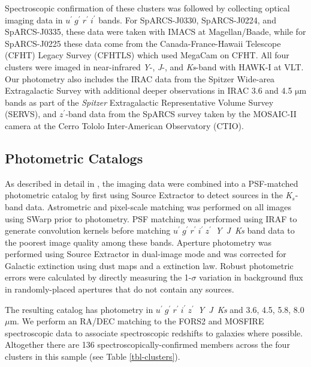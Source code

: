 Spectroscopic confirmation of these clusters was followed by collecting optical imaging data in $u^\prime\ g^\prime\ r^\prime\ i^\prime$ bands.
For SpARCS-J0330, SpARCS-J0224, and SpARCS-J0335, these data were taken with IMACS at Magellan/Baade, while for SpARCS-J0225 these data come from the Canada-France-Hawaii Telescope (CFHT) Legacy Survey (CFHTLS) which used MegaCam on CFHT.
All four clusters were imaged in near-infrared \textit{Y}-, \textit{J}-,  and \textit{Ks}-band with HAWK-I at VLT.
Our photometry also includes the IRAC data from the Spitzer Wide-area Extragalactic Survey \citep[SWIRE;][]{Lonsdale:2003ow} with additional deeper observations in IRAC 3.6 and 4.5 $\mathrm{\mu}$m bands as part of the \textit{Spitzer} Extragalactic Representative Volume Survey (SERVS), and $z^\prime$-band data from the SpARCS survey taken by the MOSAIC-II camera at the Cerro Tololo Inter-American Observatory (CTIO).

\subsection{Photometric Catalogs}

As described in detail in \citet{Nantais:2016aa}, the imaging data were combined into a PSF-matched photometric catalog by first using Source Extractor \citep{sextractor} to detect sources in the \textit{K$_s$}-band data.
Astrometric and pixel-scale matching was performed on all images using SWarp \citep{swarp} prior to photometry.
PSF matching was performed using IRAF to generate convolution kernels before matching $u^\prime~g^\prime~r^\prime~i^\prime~z^\prime$~\textit{Y~J~Ks} band data to the poorest image quality among these bands.
Aperture photometry was performed using Source Extractor in dual-image mode and was corrected for Galactic extinction using \citet{1998ApJ...500..525S} dust maps and a \citet{2011ApJ...737..103S} extinction law.
Robust photometric errors were calculated by directly measuring the 1-$\sigma$ variation in background flux in randomly-placed apertures that do not contain any sources.

The resulting catalog has photometry in $u^\prime~g^\prime~r^\prime~i^\prime~z^\prime$~\textit{Y~J~Ks} and 3.6, 4.5, 5.8, 8.0 $\mu$m.
We perform an RA/DEC matching to the FORS2 and MOSFIRE spectroscopic data to associate spectroscopic redshifts to galaxies where possible.
Altogether there are 136 spectroscopically-confirmed members across the four clusters in this sample (see Table \ref{tbl-clusters}).

